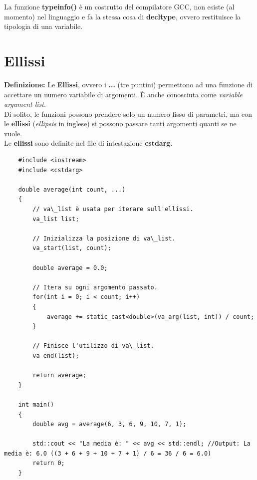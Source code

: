 \textsf{\small La funzione \textbf{typeinfo()} è un costrutto del compilatore GCC, non esiste (al momento) nel linguaggio e fa la stessa cosa di \textbf{decltype}, ovvero restituisce la tipologia di una variabile.} \\


\newpage

\section{Ellissi}

\textsf{\small \textbf{Definizione: } Le \textbf{Ellissi}, ovvero i \textbf{...} (tre puntini) permettono ad una funzione di accettare un numero variabile di argomenti. È anche conosciuta come \emph{variable argument list}. } \\

\textsf{\small Di solito, le funzioni possono prendere solo un numero fisso di parametri, ma con le \textbf{ellissi} (\emph{ellipsis} in inglese) si possono passare tanti argomenti quanti se ne vuole. } \\

\textsf{\small Le \textbf{ellissi} sono definite nel file di intestazione \textbf{cstdarg}.} \\

\begin{lstlisting}
	#include <iostream>
	#include <cstdarg>
	
	double average(int count, ...)
	{
		// va\_list è usata per iterare sull'ellissi.
		va_list list;
		
		// Inizializza la posizione di va\_list.
		va_start(list, count);
		
		double average = 0.0;
		
		// Itera su ogni argomento passato.
		for(int i = 0; i < count; i++)
		{
			average += static_cast<double>(va_arg(list, int)) / count;
		}
	
		// Finisce l'utilizzo di va\_list.
		va_end(list);
		
		return average;
	}

	int main()
	{
		double avg = average(6, 3, 6, 9, 10, 7, 1);
		
		std::cout << "La media è: " << avg << std::endl; //Output: La media è: 6.0 ((3 + 6 + 9 + 10 + 7 + 1) / 6 = 36 / 6 = 6.0)
		return 0;
	}
\end{lstlisting}

